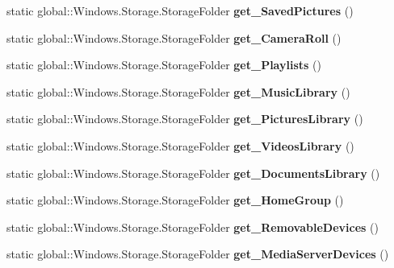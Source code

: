\begin{DoxyCompactItemize}
\mbox{\label{class_windows_1_1_storage_1_1_known_folders_a4869671672489dd57931f6074817a15c}} 
static global\+::\+Windows.\+Storage.\+Storage\+Folder {\bfseries get\+\_\+\+Saved\+Pictures} ()
\item 
\mbox{\label{class_windows_1_1_storage_1_1_known_folders_a4e8edc457f8a28894740a09fc5dbe161}} 
static global\+::\+Windows.\+Storage.\+Storage\+Folder {\bfseries get\+\_\+\+Camera\+Roll} ()
\item 
\mbox{\label{class_windows_1_1_storage_1_1_known_folders_af660eb2549fc7f22379774000686d890}} 
static global\+::\+Windows.\+Storage.\+Storage\+Folder {\bfseries get\+\_\+\+Playlists} ()
\item 
\mbox{\label{class_windows_1_1_storage_1_1_known_folders_a385778d65001ff5821c5395815254772}} 
static global\+::\+Windows.\+Storage.\+Storage\+Folder {\bfseries get\+\_\+\+Music\+Library} ()
\item 
\mbox{\label{class_windows_1_1_storage_1_1_known_folders_a653b9b1f039c720de8b02e32d4139930}} 
static global\+::\+Windows.\+Storage.\+Storage\+Folder {\bfseries get\+\_\+\+Pictures\+Library} ()
\item 
\mbox{\label{class_windows_1_1_storage_1_1_known_folders_a4e637cb715e9d1600f05e297b1f73be7}} 
static global\+::\+Windows.\+Storage.\+Storage\+Folder {\bfseries get\+\_\+\+Videos\+Library} ()
\item 
\mbox{\label{class_windows_1_1_storage_1_1_known_folders_a46d0afa10b55b07fcbe5b69b12c6a351}} 
static global\+::\+Windows.\+Storage.\+Storage\+Folder {\bfseries get\+\_\+\+Documents\+Library} ()
\item 
\mbox{\label{class_windows_1_1_storage_1_1_known_folders_afaf43060342706d67a7a25a467545948}} 
static global\+::\+Windows.\+Storage.\+Storage\+Folder {\bfseries get\+\_\+\+Home\+Group} ()
\item 
\mbox{\label{class_windows_1_1_storage_1_1_known_folders_a7d4f37e230205c7d410066952eeac000}} 
static global\+::\+Windows.\+Storage.\+Storage\+Folder {\bfseries get\+\_\+\+Removable\+Devices} ()
\item 
\mbox{\label{class_windows_1_1_storage_1_1_known_folders_afd2c3f741c42f2f472afa0f33c0a19c6}} 
static global\+::\+Windows.\+Storage.\+Storage\+Folder {\bfseries get\+\_\+\+Media\+Server\+Devices} ()
\end{DoxyCompactItemize}


